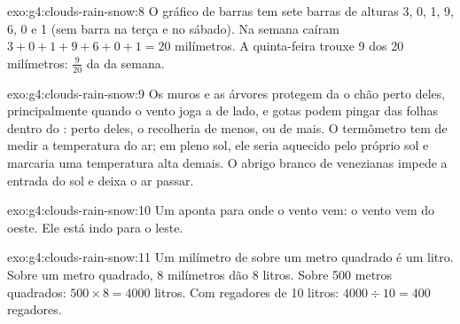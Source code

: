 \begin{solution}{exo:g4:clouds-rain-snow:8}
O gráfico de barras tem sete barras de alturas 3, 0, 1, 9, 6, 0 e 1 (sem
barra na terça e no sábado). Na semana caíram
$3 + 0 + 1 + 9 + 6 + 0 + 1 = 20$ milímetros. A quinta-feira trouxe 9 dos
20 milímetros: $\frac{9}{20}$ da  da semana.
\end{solution}

\begin{solution}{exo:g4:clouds-rain-snow:9}
Os muros e as árvores protegem da  o chão perto deles, principalmente
quando o vento joga a  de lado, e gotas podem pingar das folhas
dentro do : perto deles, o  recolheria  de
menos, ou de mais. O termômetro tem de medir a temperatura do ar; em pleno
sol, ele seria aquecido pelo próprio sol e marcaria uma temperatura alta
demais. O abrigo branco de venezianas impede a entrada do sol e deixa o ar passar.
\end{solution}

\begin{solution}{exo:g4:clouds-rain-snow:10}
Um  aponta para onde o vento vem: o vento vem do oeste. Ele está
indo para o leste.
\end{solution}

\begin{solution}{exo:g4:clouds-rain-snow:11}
Um milímetro de  sobre um metro quadrado é um litro. Sobre um metro
quadrado, 8 milímetros dão 8 litros. Sobre 500 metros quadrados:
$500 \times 8 = 4000$ litros. Com regadores de 10 litros:
$4000 \div 10 = 400$ regadores.
\end{solution}
